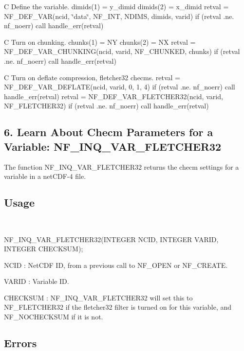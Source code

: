 C Define the variable. dimids(1) = y\+\_\+dimid dimids(2) = x\+\_\+dimid retval = N\+F\+\_\+\+D\+E\+F\+\_\+\+V\+AR(ncid, \char`\"{}data\char`\"{}, N\+F\+\_\+\+I\+NT, N\+D\+I\+MS, dimids, varid) if (retval .ne. nf\+\_\+noerr) call handle\+\_\+err(retval)

C Turn on chunking. chunks(1) = NY chunks(2) = NX retval = N\+F\+\_\+\+D\+E\+F\+\_\+\+V\+A\+R\+\_\+\+C\+H\+U\+N\+K\+I\+N\+G(ncid, varid, N\+F\+\_\+\+C\+H\+U\+N\+K\+E\+D, chunks) if (retval .ne. nf\+\_\+noerr) call handle\+\_\+err(retval)

C Turn on deflate compression, fletcher32 checms. retval = N\+F\+\_\+\+D\+E\+F\+\_\+\+V\+A\+R\+\_\+\+D\+E\+F\+L\+A\+T\+E(ncid, varid, 0, 1, 4) if (retval .ne. nf\+\_\+noerr) call handle\+\_\+err(retval) retval = N\+F\+\_\+\+D\+E\+F\+\_\+\+V\+A\+R\+\_\+\+F\+L\+E\+T\+C\+H\+E\+R32(ncid, varid, N\+F\+\_\+\+F\+L\+E\+T\+C\+H\+E\+R32) if (retval .ne. nf\+\_\+noerr) call handle\+\_\+err(retval)

\subsection*{6. Learn About Checm Parameters for a Variable\+: {\ttfamily N\+F\+\_\+\+I\+N\+Q\+\_\+\+V\+A\+R\+\_\+\+F\+L\+E\+T\+C\+H\+E\+R32} }

The function N\+F\+\_\+\+I\+N\+Q\+\_\+\+V\+A\+R\+\_\+\+F\+L\+E\+T\+C\+H\+E\+R32 returns the checm settings for a variable in a net\+C\+D\+F-\/4 file.

\subsection*{Usage }

 

N\+F\+\_\+\+I\+N\+Q\+\_\+\+V\+A\+R\+\_\+\+F\+L\+E\+T\+C\+H\+E\+R32(\+I\+N\+T\+E\+G\+E\+R N\+C\+I\+D, I\+N\+T\+E\+G\+E\+R V\+A\+R\+I\+D, I\+N\+T\+E\+G\+E\+R C\+H\+E\+C\+K\+S\+U\+M);

{\ttfamily N\+C\+ID} \+: Net\+C\+DF ID, from a previous call to N\+F\+\_\+\+O\+P\+EN or N\+F\+\_\+\+C\+R\+E\+A\+TE.

{\ttfamily V\+A\+R\+ID} \+: Variable ID.

{\ttfamily C\+H\+E\+C\+K\+S\+UM} \+: N\+F\+\_\+\+I\+N\+Q\+\_\+\+V\+A\+R\+\_\+\+F\+L\+E\+T\+C\+H\+E\+R32 will set this to N\+F\+\_\+\+F\+L\+E\+T\+C\+H\+E\+R32 if the fletcher32 filter is turned on for this variable, and N\+F\+\_\+\+N\+O\+C\+H\+E\+C\+K\+S\+UM if it is not.

\subsection*{Errors }

